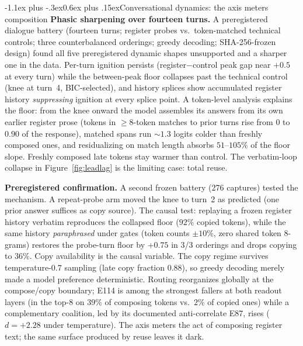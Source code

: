 \documentclass[10pt]{article}
\makeatletter
\renewcommand\section{\@startsection{section}{1}{\z@}%
  {-1.1ex plus -.3ex}{0.6ex plus .15ex}{\normalfont\large\bfseries}}
\makeatother
\begin{document}
\vspace{-0.4em}
\section{Conversational dynamics: the axis meters composition}
\vspace{-0.2em}
\textbf{Phasic sharpening over fourteen turns.} A preregistered dialogue battery
(fourteen turns; register probes vs.\ token-matched technical controls; three
counterbalanced orderings; greedy decoding; SHA-256-frozen design) found all
five preregistered dynamic shapes unsupported and a sharper one in the data.
Per-turn ignition persists (register$-$control peak gap near $+0.5$ at every
turn) while the between-peak floor collapses past the technical control (knee
at turn~4, BIC-selected), and history splices show accumulated register history
\emph{suppressing} ignition at every splice point. A token-level analysis
explains the floor: from the knee onward the model assembles its answers from
its own earlier register prose (tokens in $\ge$8-token matches to prior turns
rise from $0$ to $0.90$ of the response), matched spans run $\sim$$1.3$ logits
colder than freshly composed ones, and residualizing on match length absorbs
$51$--$105\%$ of the floor slope. Freshly composed late tokens stay warmer than
control. The verbatim-loop collapse in Figure~\ref{fig:leadlag} is the limiting
case: total reuse.

\textbf{Preregistered confirmation.} A second frozen battery (276 captures)
tested the mechanism. A repeat-probe arm moved the knee to turn~2 as predicted
(one prior answer suffices as copy source). The causal test: replaying a
frozen register history verbatim reproduces the collapsed floor ($92\%$ copied
tokens), while the same history \emph{paraphrased} under gates (token counts
$\pm 10\%$, zero shared token 8-grams) restores the probe-turn floor by $+0.75$
in 3/3 orderings and drops copying to $36\%$. Copy availability is the causal
variable. The copy regime survives temperature-$0.7$ sampling (late copy
fraction $0.88$), so greedy decoding merely made a model preference
deterministic. Routing reorganizes globally at the compose/copy boundary; E114
is among the strongest fallers at both readout layers (in the top-8 on $39\%$
of composing tokens vs.\ $2\%$ of copied ones) while a complementary coalition,
led by its documented anti-correlate E87, rises ($d{=}+2.28$ under
temperature). The axis meters the act of composing register text; the same
surface produced by reuse leaves it dark.
\end{document}
